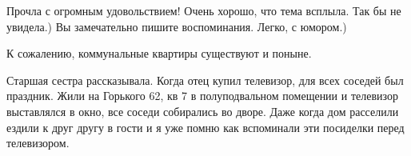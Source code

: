 \begin{itemize}

Прочла с огромным удовольствием! Очень хорошо, что тема всплыла. Так бы не
увидела.) Вы замечательно пишите воспоминания. Легко, с юмором.)

К сожалению, коммунальные квартиры существуют и поныне.


Старшая сестра рассказывала. Когда отец купил телевизор, для всех соседей был
праздник. Жили на Горького 62, кв 7 в полуподвальном помещении и телевизор
выставлялся в окно, все соседи собирались во дворе. Даже когда дом расселили
ездили к друг другу в гости и я уже помню как вспоминали эти посиделки перед
телевизором.




\end{itemize} %
